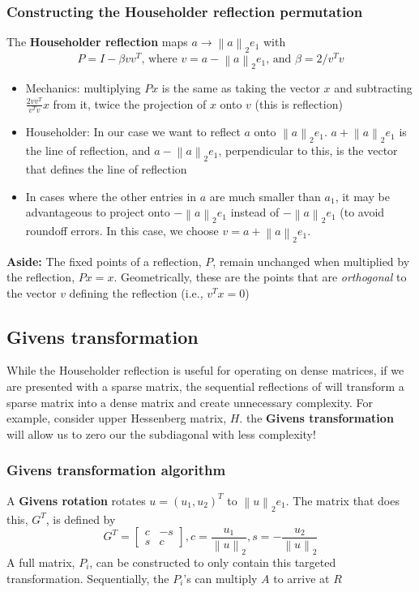 \documentclass{article}
\newcommand{\norm}[2]{\left\lVert#1\right\rVert_#2}
\begin{document}
\subsubsection{Constructing the Householder reflection permutation}
\noindent The \textbf{Householder reflection} maps $a \rightarrow \norm{a}{2}e_1$ with
\begin{equation*}
    P = I - \beta vv^T \textrm{, where $v = a - \norm{a}{2}e_1$, and $\beta = 2/v^Tv$}
\end{equation*}
\begin{itemize}
    \item Mechanics: multiplying $Px$ is the same as taking the vector $x$ and subtracting $\frac{2vv^T}{v^Tv}x$ from it, twice the projection of $x$ onto $v$ (this is reflection)
    \item Householder: In our case we want to reflect $a$ onto $\norm{a}{2}e_1$.  $a + \norm{a}{2}e_1$ is the line of reflection, and $a - \norm{a}{2}e_1$, perpendicular to this, is the vector that defines the line of reflection
    \item In cases where the other entries in $a$ are much smaller than $a_1$, it may be advantageous to project onto $-\norm{a}{2}e_1$ instead of $-\norm{a}{2}e_1$ (to avoid roundoff errors. In this case, we choose $v = a + \norm{a}{2}e_1$.
\end{itemize}

\noindent \textbf{Aside:} The fixed points of a reflection, $P$, remain unchanged when multiplied by the reflection, $Px=x$. Geometrically, these are the points that are \textit{orthogonal} to the vector $v$ defining the reflection (i.e., $v^Tx=0$)


\subsection{Givens transformation}
While the Householder reflection is useful for operating on dense matrices, if we are presented with a sparse matrix, the sequential reflections of will transform a sparse matrix into a dense matrix and create unnecessary complexity. For example, consider upper Hessenberg matrix, $H$. the \textbf{Givens transformation} will allow us to zero our the subdiagonal with less complexity!

\subsubsection{Givens transformation algorithm}
A \textbf{Givens rotation} rotates $u = (u_1, u_2)^T$ to $\norm{u}{2}e_1$. The matrix that does this, $G^T$, is defined by
\begin{equation*}
    G^T = \begin{bmatrix} c & -s \\ s & c \end{bmatrix}, c = \frac{u_1}{\norm{u}{2}}, s = -\frac{u_2}{\norm{u}{2}}
\end{equation*}
A full matrix, $P_i$, can be constructed to only contain this targeted transformation. Sequentially, the $P_i$'s can multiply $A$ to arrive at $R$
\end{document}

